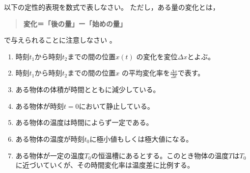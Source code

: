 \documentclass[twocolumn,11pt]{jarticle}
\begin{document}
\nquestion
以下の定性的表現を数式で表しなさい。
ただし，ある量の変化とは，
\begin{quote}
  \textbf{変化＝「後の量」ー「始めの量」}
\end{quote}
で与えられることに注意しなさい
。

\begin{enumerate}
\item\label{ditem:displaycement} 時刻$t_1$から時刻$t_2$までの間の位置$x(t)$
  の変化を変位$\Delta x$とよぶ。
\item\label{ditem:avrvel} 時刻$t_1$から時刻$t_2$までの間の位置$x$
  の平均変化率を$\displaystyle\frac{\Delta x}{\Delta t}$で表す。
\item\label{ditem:dV>0} ある物体の体積が時間とともに減少している。
\item\label{ditem:v=0} ある物体が時刻$t=0$において静止している。
\item\label{ditem:dT=0} ある物体の温度は時間によらず一定である。
\item\label{ditem:dT(t0)=0}
  ある物体の温度が時刻$t_0$に極小値もしくは極大値になる。
\item\label{ditem:dT} ある物体が一定の温度$T_0$の恒温槽にあるとする。このとき物体の温度$T$は$T_0$に近づいていくが、その時間変化率は温度差に比例する。
\end{enumerate}
\end{document}
